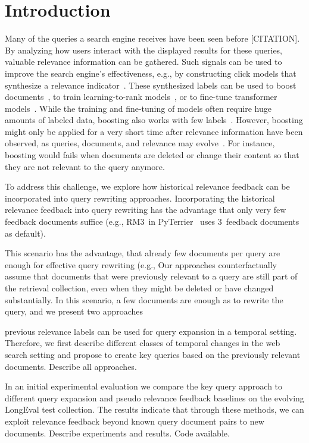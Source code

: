 \section{Introduction}

Many of the queries a search engine receives have been seen before {\color{red}[CITATION]}. By analyzing how users interact with the displayed results for these queries, valuable relevance information can be gathered. Such signals can be used to improve the search engine's effectiveness, e.g., by constructing click models that synthesize a relevance indicator~\cite{chuklin:2015}. These synthesized labels can be used to boost documents~\cite{keller:2024b}, to train learning-to-rank models~\cite{liu:2011}, or to fine-tune transformer models~\cite{lin:2021}. While the training and fine-tuning of models often require huge amounts of labeled data, boosting also works with few labels~\cite{keller:2024b}. However, boosting might only be applied for a very short time after relevance information have been observed, as queries, documents, and relevance may evolve~\cite{keller:2024}. For instance, boosting would fails when documents are deleted or change their content so that they are not relevant to the query anymore.

To address this challenge, we explore how historical relevance feedback can be incorporated into query rewriting approaches. Incorporating the historical relevance feedback into query rewriting has the advantage that only very few feedback documents suffice (e.g., RM3~in PyTerrier~\cite{macdonald:2020} uses 3~feedback documents as default).

This scenario has the advantage, that already few documents per query are enough for effective query rewriting (e.g.,  Our approaches counterfactually assume that documents that were previously relevant to a query are still part of the retrieval collection, even when they might be deleted or have changed substantially. In this scenario, a few documents are enough as to rewrite the query, and we present two approaches 

previous relevance labels can be used for query expansion in a temporal setting. Therefore, we first describe different classes of temporal changes in the web search setting and propose to create key queries based on the previously relevant documents. {\color{red} Describe all approaches.}

In an initial experimental evaluation we compare the key query approach to different query expansion and pseudo relevance feedback baselines on the evolving LongEval test collection. The results indicate that through these methods, we can exploit relevance feedback beyond known query document pairs to new documents. {\color{red} Describe experiments and results. Code available.}



